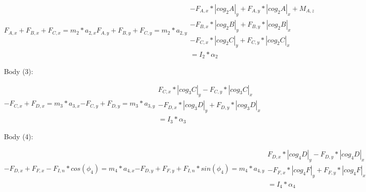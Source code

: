 \documentclass[a4paper]{article}
\begin{document}
\begin{subequations}
	\begin{equation}
		F_{A,x} + F_{B,x} + F_{C,x}=m_2*a_{2,x}
	\end{equation}
	\begin{equation}
		F_{A,y} + F_{B,y} + F_{C,y}=m_2*a_{2,y}
	\end{equation}
	\begin{equation}
	\begin{split}
		-F_{A,x}*|cog_2A|_y+F_{A,y}*|cog_2A|_x+M_{A,z}\\-F_{B,x}*|cog_2B|_y+F_{B,y}*|cog_2B|_x\\-F_{C,x}*|cog_2C|_y+F_{C,y}*|cog_2C|_x\\=I_2*\alpha_2
	\end{split}
	\end{equation}
\end{subequations}

Body (3):

\begin{subequations}
	\begin{equation}
		-F_{C,x} + F_{D,x}=m_3*a_{3,x}
	\end{equation}
	\begin{equation}
		-F_{C,y} + F_{D,y}=m_3*a_{3,y}
	\end{equation}
	\begin{equation}
	\begin{split}
		F_{C,x}*|cog_3C|_y-F_{C,y}*|cog_3C|_x\\-F_{D,x}*|cog_3D|_y+F_{D,y}*|cog_3D|_x\\=I_3*\alpha_3
		\end{split}
	\end{equation}
\end{subequations}


Body (4):

\begin{subequations}
	\begin{equation}
		-F_{D,x}+F_{F,x}-F_{I,n}*cos(\phi_4)=m_4*a_{4,x}
	\end{equation}
	\begin{equation}
		-F_{D,y}+F_{F,y}+F_{I,n}*sin(\phi_4)=m_4*a_{4,y}
	\end{equation}
	\begin{equation}
	\begin{split}
		F_{D,x}*|cog_4D|_y-F_{D,y}*|cog_4D|_x\\-F_{F,x}*|cog_4F|_y+F_{F,y}*|cog_4F|_x\\=I_4*\alpha_4
	\end{split}
	\end{equation}
\end{subequations}
\end{document}
